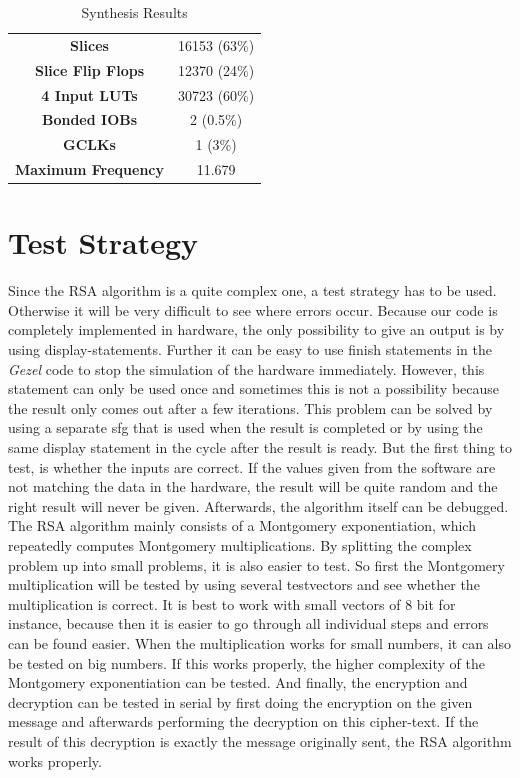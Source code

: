 \documentclass[a4paper]{article}
\begin{document}
\begin{table}[ht]
	\begin{center}	
		\begin{tabular}{c|c}
			\textbf{Slices} & 16153 (63\%)\\
			\textbf{Slice Flip Flops} & 12370 (24\%)\\
			\textbf{4 Input LUTs} & 30723 (60\%)\\
			\textbf{Bonded IOBs} & 2 (0.5\%)\\
			\textbf{GCLKs} & 1 (3\%)\\
			\textbf{Maximum Frequency} & 11.679 \mega \hertz
		\end{tabular}
	\end{center}
	\caption{Synthesis Results}
	\label{tab:synthesis results}
\end{table} 

\section{Test Strategy}

Since the RSA algorithm is a quite complex one, a test strategy has to be used. Otherwise it will be very difficult to see where errors occur. Because our code is completely implemented in hardware, the only possibility to give an output is by using display-statements. Further it can be easy to use finish statements in the \textit{Gezel} code to stop the simulation of the hardware immediately. However, this statement can only be used once and sometimes this is not a possibility because the result only comes out after a few iterations. This problem can be solved by using a separate sfg that is used when the result is completed or by using the same display statement in the cycle after the result is ready. But the first thing to test, is whether the inputs are correct. If the values given from the software are not matching the data in the hardware, the result will be quite random and the right result will never be given. Afterwards, the algorithm itself can be debugged.\\

The RSA algorithm mainly consists of a Montgomery exponentiation, which repeatedly computes Montgomery multiplications. By splitting the complex problem up into small problems, it is also easier to test. So first the Montgomery multiplication will be tested by using several testvectors and see whether the multiplication is correct. It is best to work with small vectors of 8 bit for instance, because then it is easier to go through all individual steps and errors can be found easier. When the multiplication works for small numbers, it can also be tested on big numbers. If this works properly, the higher complexity of the Montgomery exponentiation can be tested. And finally, the encryption and decryption can be tested in serial by first doing the encryption on the given message and afterwards performing the decryption on this cipher-text. If the result of this decryption is exactly the message originally sent, the RSA algorithm works properly.\\
\end{document}
